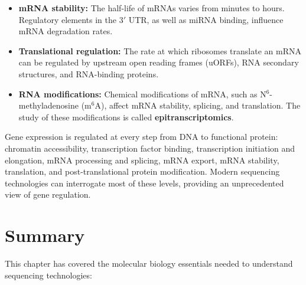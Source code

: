 \begin{itemize}[itemsep=2pt]
  \item \textbf{mRNA stability:} The half-life of mRNAs varies from minutes to hours. Regulatory elements in the 3$'${} UTR, as well as miRNA binding, influence mRNA degradation rates.
  \item \textbf{Translational regulation:} The rate at which ribosomes translate an mRNA can be regulated by upstream open reading frames (uORFs), RNA secondary structures, and RNA-binding proteins.
  \item \textbf{RNA modifications:} Chemical modifications of mRNA, such as N$^6$-methyladenosine (m$^6$A), affect mRNA stability, splicing, and translation. The study of these modifications is called \textbf{epitranscriptomics}.
\end{itemize}

\begin{keyconcept}[title={Multi-Level Gene Regulation}]
Gene expression is regulated at every step from DNA to functional protein: chromatin accessibility, transcription factor binding, transcription initiation and elongation, mRNA processing and splicing, mRNA export, mRNA stability, translation, and post-translational protein modification. Modern sequencing technologies can interrogate most of these levels, providing an unprecedented view of gene regulation.
\end{keyconcept}


\section{Summary}
\label{sec:molbio:summary}

This chapter has covered the molecular biology essentials needed to understand sequencing technologies:

